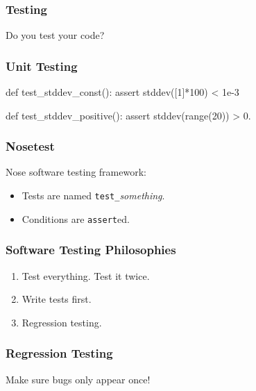 \begin{frame}[fragile]
\frametitle{Testing}

Do you test your code?

\end{frame}

\begin{frame}[fragile]
\frametitle{Unit Testing}

\begin{python}
def test_stddev_const():
    assert stddev([1]*100) < 1e-3

def test_stddev_positive():
    assert stddev(range(20)) > 0.
\end{python}

\end{frame}

\begin{frame}[fragile]
\frametitle{Nosetest}

Nose software testing framework:
\begin{itemize}
\item Tests are named \lstinline{test_}\textit{something}.
\item Conditions are \lstinline{assert}ed.
\end{itemize}

\end{frame}

\begin{frame}[fragile]
\frametitle{Software Testing Philosophies}

\begin{enumerate}
\item Test everything. Test it twice.
\item Write tests first.
\item Regression testing.
\end{enumerate}
\end{frame}

\begin{frame}[fragile]
\frametitle{Regression Testing}

Make sure bugs only appear once!

\end{frame}


